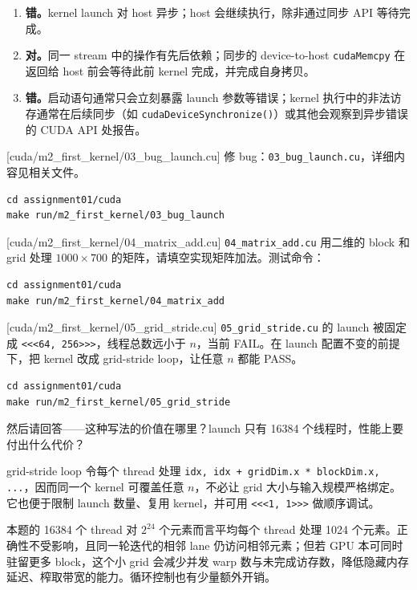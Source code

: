 \documentclass[11pt,a4paper,fontset=none]{ctexart}
\begin{document}
\begin{answer}
\begin{enumerate}[label=(\alph*)]
  \item \textbf{错。}kernel launch 对 host 异步；host 会继续执行，除非通过同步 API 等待完成。
  \item \textbf{对。}同一 stream 中的操作有先后依赖；同步的 device-to-host \texttt{cudaMemcpy} 在返回给 host 前会等待此前 kernel 完成，并完成自身拷贝。
  \item \textbf{错。}启动语句通常只会立刻暴露 launch 参数等错误；kernel 执行中的非法访存通常在后续同步（如 \texttt{cudaDeviceSynchronize()}）或其他会观察到异步错误的 CUDA API 处报告。
\end{enumerate}
\end{answer}

[cuda/m2\_first\_kernel/03\_bug\_launch.cu]
修 bug：\texttt{03\_bug\_launch.cu}，详细内容见相关文件。

\begin{lstlisting}
cd assignment01/cuda
make run/m2_first_kernel/03_bug_launch
\end{lstlisting}

[cuda/m2\_first\_kernel/04\_matrix\_add.cu]
\texttt{04\_matrix\_add.cu} 用二维的 block 和 grid 处理 $1000 \times 700$ 的矩阵，请填空实现矩阵加法。测试命令：

\begin{lstlisting}
cd assignment01/cuda
make run/m2_first_kernel/04_matrix_add
\end{lstlisting}

[cuda/m2\_first\_kernel/05\_grid\_stride.cu]
\texttt{05\_grid\_stride.cu} 的 launch 被固定成 \texttt{<<<64, 256>>>}，线程总数远小于 $n$，当前 FAIL。在 launch 配置不变的前提下，把 kernel 改成 grid-stride loop，让任意 $n$ 都能 PASS。

\begin{lstlisting}
cd assignment01/cuda
make run/m2_first_kernel/05_grid_stride
\end{lstlisting}

然后请回答——这种写法的价值在哪里？launch 只有 16384 个线程时，性能上要付出什么代价？

\begin{answer}
grid-stride loop 令每个 thread 处理 \texttt{idx, idx + gridDim.x * blockDim.x, ...}，因而同一个 kernel 可覆盖任意 $n$，不必让 grid 大小与输入规模严格绑定。它也便于限制 launch 数量、复用 kernel，并可用 \texttt{<<<1, 1>>>} 做顺序调试。

本题的 16384 个 thread 对 $2^{24}$ 个元素而言平均每个 thread 处理 1024 个元素。正确性不受影响，且同一轮迭代的相邻 lane 仍访问相邻元素；但若 GPU 本可同时驻留更多 block，这个小 grid 会减少并发 warp 数与未完成访存数，降低隐藏内存延迟、榨取带宽的能力。循环控制也有少量额外开销。
\end{answer}
\end{document}

